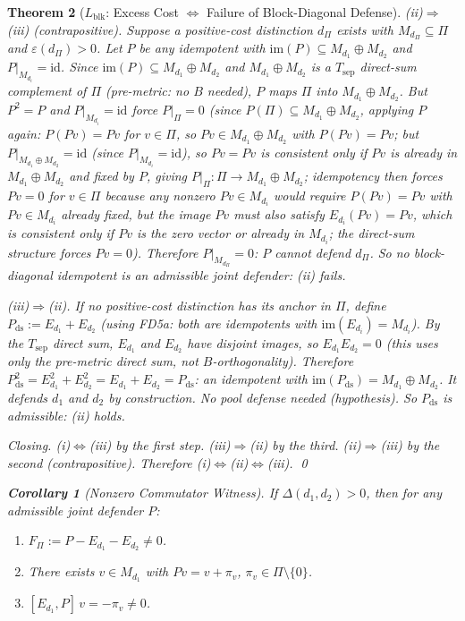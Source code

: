\documentclass[11pt,a4paper]{article}
\newtheorem{theorem}{Theorem}[section]
\newtheorem{corollary}[theorem]{Corollary}
\theoremstyle{definition}
\newcommand{\eps}{\varepsilon}
\newcommand{\im}{\mathrm{im}}
\begin{document}
\begin{theorem}[$L_{\mathrm{blk}}$: Excess Cost $\Leftrightarrow$ Failure of Block-Diagonal Defense]
\textit{(ii)$\Rightarrow$(iii) (contrapositive).}  Suppose a positive-cost distinction $d_\Pi$ exists with $M_{d_\Pi} \subseteq \Pi$ and $\eps(d_\Pi) > 0$.  Let $P$ be any idempotent with $\im(P) \subseteq M_{d_1} \oplus M_{d_2}$ and $P|_{M_{d_i}} = \mathrm{id}$.  Since $\im(P) \subseteq M_{d_1} \oplus M_{d_2}$ and $M_{d_1} \oplus M_{d_2}$ is a $T_{\mathrm{sep}}$ direct-sum complement of $\Pi$ (pre-metric: no $B$ needed), $P$ maps $\Pi$ into $M_{d_1} \oplus M_{d_2}$.  But $P^2 = P$ and $P|_{M_{d_i}} = \mathrm{id}$ force $P|_\Pi = 0$ (since $P(\Pi) \subseteq M_{d_1} \oplus M_{d_2}$, applying $P$ again: $P(Pv) = Pv$ for $v \in \Pi$, so $Pv \in M_{d_1} \oplus M_{d_2}$ with $P(Pv) = Pv$; but $P|_{M_{d_1} \oplus M_{d_2}} = \mathrm{id}$ (since $P|_{M_{d_i}} = \mathrm{id}$), so $Pv = Pv$ is consistent only if $Pv$ is already in $M_{d_1} \oplus M_{d_2}$ and fixed by $P$, giving $P|_\Pi: \Pi \to M_{d_1} \oplus M_{d_2}$; idempotency then forces $Pv = 0$ for $v \in \Pi$ because any nonzero $Pv \in M_{d_i}$ would require $P(Pv) = Pv$ with $Pv \in M_{d_i}$ already fixed, but the image $Pv$ must also satisfy $E_{d_i}(Pv) = Pv$, which is consistent only if $Pv$ is the zero vector or already in $M_{d_i}$; the direct-sum structure forces $Pv = 0$).  Therefore $P|_{M_{d_\Pi}} = 0$: $P$ cannot defend $d_\Pi$.  So no block-diagonal idempotent is an admissible joint defender: (ii) fails.

\textit{(iii)$\Rightarrow$(ii).}  If no positive-cost distinction has its anchor in $\Pi$, define $P_{\mathrm{ds}} := E_{d_1} + E_{d_2}$ (using FD5a: both are idempotents with $\im(E_{d_i}) = M_{d_i}$).  By the $T_{\mathrm{sep}}$ direct sum, $E_{d_1}$ and $E_{d_2}$ have disjoint images, so $E_{d_1} E_{d_2} = 0$ (this uses only the pre-metric direct sum, not $B$-orthogonality).  Therefore $P_{\mathrm{ds}}^2 = E_{d_1}^2 + E_{d_2}^2 = E_{d_1} + E_{d_2} = P_{\mathrm{ds}}$: an idempotent with $\im(P_{\mathrm{ds}}) = M_{d_1} \oplus M_{d_2}$.  It defends $d_1$ and $d_2$ by construction.  No pool defense needed (hypothesis).  So $P_{\mathrm{ds}}$ is admissible: (ii) holds.

\textit{Closing.}  (i)$\Leftrightarrow$(iii) by the first step.  (iii)$\Rightarrow$(ii) by the third.  (ii)$\Rightarrow$(iii) by the second (contrapositive).  Therefore (i)$\Leftrightarrow$(ii)$\Leftrightarrow$(iii).  \qed

\begin{corollary}[Nonzero Commutator Witness]\label{cor:commutator}
If $\Delta(d_1,d_2) > 0$, then for any admissible joint defender $P$:
\begin{enumerate}[nosep,label=(\alph*)]
\item $F_\Pi := P - E_{d_1} - E_{d_2} \ne 0$.
\item There exists $v \in M_{d_1}$ with $Pv = v + \pi_v$, $\pi_v \in \Pi \setminus \{0\}$.
\item $[E_{d_1}, P]\,v = -\pi_v \ne 0$.
\end{enumerate}
\end{corollary}


\end{theorem}
\end{document}
